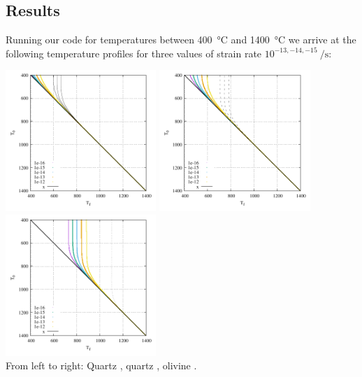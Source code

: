 \subsection*{Results}


Running our code for temperatures between 400~\si{\celsius} and 1400~\si{\celsius}
we arrive at the following temperature profiles for three values of strain rate 
$10^{-13,-14,-15}~\si{\per\second}$:

\begin{center}
\includegraphics[width=5.7cm]{python_codes/fieldstone_167/1kelvin/fig6.pdf}
\includegraphics[width=5.7cm]{python_codes/fieldstone_167/2kelvin/fig6.pdf}
\includegraphics[width=5.7cm]{python_codes/fieldstone_167/3kelvin/fig6.pdf}\\
{\captionfont From left to right: Quartz \cite{brko80}, quartz \cite{stsa94}, olivine \cite{brko80}.}
\end{center}


